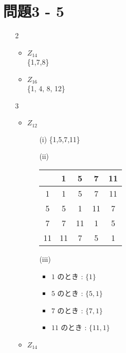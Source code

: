 \documentclass[12pt,a4paper]{jsarticle}
\begin{document}
\section*{問題3 - 5}
\begin{enumerate}
 \item[2]  \mbox{} \\
	\begin{itemize}
		\item $Z_{14}$ \\
			\{1,7,8\}
		\item $Z_{16}$ \\
			\{1, 4, 8, 12\}
	\end{itemize}
 \item[3]  \mbox{} \\
	\begin{itemize}
		\item $Z_{12}$ \\
			\begin{itemize}
				\item[(i)] 
					\{1,5,7,11\}
				\item[(ii)]
 					\begin{table}[!h]
						\begin{center}
							\begin{tabular}{c|c c c c}
						 		   &  1 &  5 &  7 & 11 \\ \hline
							 	 1 &  1 &  5 &  7 & 11 \\
								 5 &  5 &  1 & 11 &  7 \\
							 	 7 &  7 & 11 &  1 &  5 \\
								11 & 11 &  7 &  5 &  1 \\
							\end{tabular}
						\end{center}
					\end{table}
				\item[(iii)] 
					\begin{itemize}
						\item $1$ のとき : $\{1\}$
						\item $5$ のとき : $\{5, 1\}$
						\item $7$ のとき : $\{7, 1\}$
						\item $11$ のとき : $\{11, 1\}$
					\end{itemize}
			\end{itemize}
		\item $Z_{14}$ \\

\end{itemize}
\end{enumerate}
\end{document}
